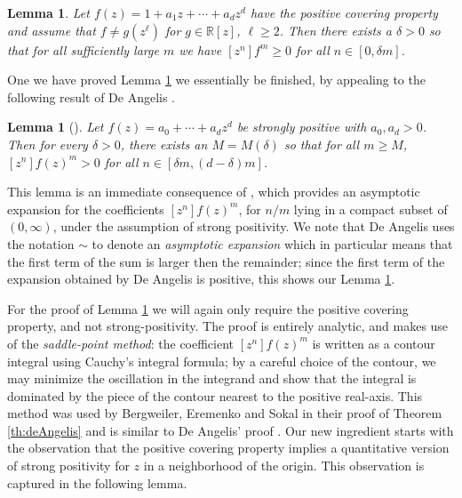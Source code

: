 \documentclass{daj}
\newcommand{\R}{\mathbb{R}}
\newtheorem{lemma}[theorem]{Lemma}
\theoremstyle{definition}
\theoremstyle{remark}
\begin{document}
\begin{lemma} \label{lem:first-delta}
	Let $f(z) = 1 + a_1 z + \cdots + a_d z^d$ have the positive covering property and assume that $f\not= g(z^{\ell})$ for $g \in \R[z]$, $\ell \geq 2$.  Then there exists a $\delta > 0$ so that for all sufficiently large $m$ we have
 $[z^n] f^m \geq 0$ for all $n \in [0,\delta m]$.  
\end{lemma}

 
One we have proved Lemma \ref{lem:first-delta} we essentially be finished, by appealing to the following result of De Angelis \cite{deAngelis-positivity}.

\begin{lemma}[\cite{deAngelis-positivity}]\label{lem:middle-coeffs}
	Let $f(z) = a_0 + \cdots + a_d z^d$ be strongly positive with $a_0, a_d > 0$.  Then for every $\delta > 0$, there exists an $M = M(\delta)$ so that for all $m \geq M$, $[z^n] f(z)^m > 0$ for all $n \in [\delta m, (d - \delta)m]$.
\end{lemma}

This lemma is an immediate consequence of \cite[Theorem 4.1]{deAngelis-positivity}, which provides an asymptotic expansion for the coefficients $[z^n] f(z)^m$, for $n/m$ lying in a compact subset of $(0,\infty)$, under the assumption of strong positivity.  We note that De Angelis uses the notation $\sim$ to denote an \emph{asymptotic expansion} which in particular means that the first term of the sum is larger then the remainder; since the first term of the expansion obtained by De Angelis is positive, this shows our Lemma \ref{lem:middle-coeffs}.

For the proof of Lemma \ref{lem:first-delta} we will again only require the positive covering property, and not strong-positivity.  The proof is entirely analytic, and makes use of the \emph{saddle-point method}: the coefficient $[z^n] f(z)^m$ is written as a contour integral using Cauchy's integral formula; by a careful choice of the contour, we may minimize the oscillation in the integrand and show that the integral is dominated by the piece of the contour nearest to the positive real-axis.  This method was used by Bergweiler, Eremenko and Sokal \cite{bes} in their proof of Theorem \ref{th:deAngelis} and is similar to De Angelis' proof \cite{deAngelis-positivity}. Our new ingredient starts with the observation that the positive covering property implies a quantitative version of strong positivity for $z$ in a neighborhood of the origin. 
This observation is captured in the following lemma. 
 
\end{document}
